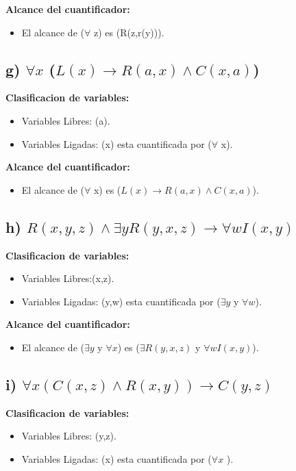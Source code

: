 \documentclass[11pt,letterpaper]{article}
\begin{document}
\textbf{Alcance del cuantificador:}
\begin{itemize}
    \item El alcance de ($\forall$ z) es (R(z,r(y))).
\end{itemize}
  

\subsection*{g) $\forall x$ ($L(x) \rightarrow R(a,x) \wedge  C(x,a)$)}

\textbf{Clasificacion de variables:}
\begin{itemize}
    \item Variables Libres: (a).
    \item Variables Ligadas: (x) esta cuantificada por ($\forall$ x).
\end{itemize}

\textbf{Alcance del cuantificador:}
\begin{itemize}
    \item El alcance de ($\forall$ x) es ($L(x) \rightarrow R(a,x) \wedge C(x,a)$).
\end {itemize}

\subsection*{h) $R(x,y,z) \land \exists y R(y,x,z) \rightarrow \forall w I(x,y)$}

\textbf{Clasificacion de variables:}
\begin{itemize}
    \item Variables Libres:(x,z).
    \item Variables Ligadas: (y,w) esta cuantificada por ($\exists y$ y $\forall w$).
\end{itemize}

\textbf{Alcance del cuantificador:}
\begin{itemize}
    \item El alcance de ($\exists y$ y $\forall x$) es ($\exists R(y,x,z)$ y $\forall w I(x,y)$).
\end{itemize}

\subsection*{i) $\forall x(C(x,z) \wedge  R(x,y)) \rightarrow C(y,z)$}

\textbf{Clasificacion de variables:}
\begin{itemize}
    \item Variables Libres: (y,z).
    \item Variables Ligadas: (x) esta cuantificada por ($\forall x$ ).
\end{itemize}
\end{document}
